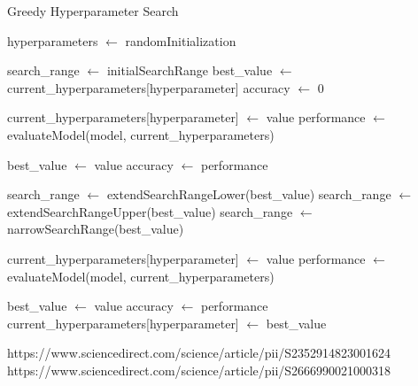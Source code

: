 \begin{algorithm}
    \caption{Greedy Hyperparameter Search}\label{alg:greedy_hyperparameter_search}
    \begin{algorithmic}[1]
        \State hyperparameters $\gets$ randomInitialization
        
            \State search\_range $\gets$ initialSearchRange
            \State best\_value $\gets$ current\_hyperparameters[hyperparameter]
            \State accuracy $\gets$ 0
            
                \State current\_hyperparameters[hyperparameter] $\gets$ value
                \State performance $\gets$ evaluateModel(model, current\_hyperparameters)
                
                    \State best\_value $\gets$ value
                    \State accuracy $\gets$ performance
                \EndIf
            \EndFor
            
                \State search\_range $\gets$ extendSearchRangeLower(best\_value)
                \State search\_range $\gets$ extendSearchRangeUpper(best\_value)
            \Else
                \State search\_range $\gets$ narrowSearchRange(best\_value)
            \EndIf
            
                \State current\_hyperparameters[hyperparameter] $\gets$ value
                \State performance $\gets$ evaluateModel(model, current\_hyperparameters)
                
                    \State best\_value $\gets$ value
                    \State accuracy $\gets$ performance
                \EndIf
            \EndFor
            \State current\_hyperparameters[hyperparameter] $\gets$ best\_value
        \EndFor
    \end{algorithmic}
\end{algorithm}



https://www.sciencedirect.com/science/article/pii/S2352914823001624
https://www.sciencedirect.com/science/article/pii/S2666990021000318



